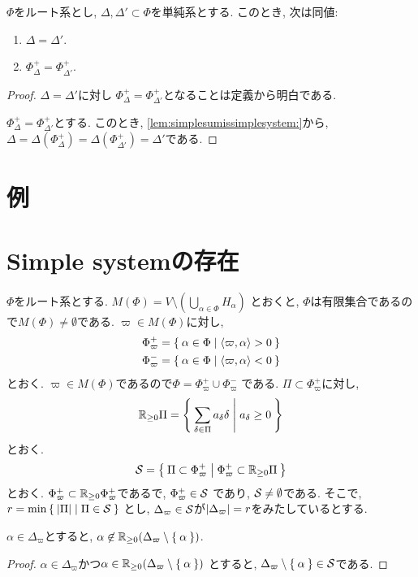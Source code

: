 \begin{theorem}
  $\Phi$をルート系とし,
  $\Delta,\Delta'\subset \Phi$を単純系とする.
  このとき, 次は同値:
  \begin{enumerate}
  \item $\Delta=\Delta'$.
  \item $\Phi_\Delta^+=\Phi_{\Delta'}^+$.
  \end{enumerate}
\end{theorem}
\begin{proof}
  $\Delta=\Delta'$に対し
  $\Phi_\Delta^+=\Phi_{\Delta'}^+$となることは定義から明白である.

  $\Phi_\Delta^+=\Phi_{\Delta'}^+$とする.
  このとき,
  \cref{lem:simplesumissimplesystem:}から,
  $\Delta=\Delta(\Phi_\Delta^+)=\Delta(\Phi_{\Delta'}^+)=\Delta'$である.

\end{proof}

\section{例}

\section{Simple systemの存在}
$\Phi$をルート系とする.
$M(\Phi)=V \setminus (\bigcup_{\alpha\in\Phi}H_\alpha)$
とおくと,
$\Phi$は有限集合であるので$M(\Phi)\neq \emptyset$である.
$\varpi\in M(\Phi)$に対し,
\begin{align*}
  \Phi_{\varpi}^+&=\Set{\alpha\in\Phi|\Braket{\varpi,\alpha}>0}\\
  \Phi_{\varpi}^-&=\Set{\alpha\in\Phi|\Braket{\varpi,\alpha}<0}
\end{align*}
とおく.
$\varpi\in M(\Phi)$であるので$\Phi=\Phi_{\varpi}^+\cup \Phi_{\varpi}^-$
である.
$\Pi\subset \Phi_{\varpi}^+$に対し,
\begin{align*}
  \mathbb{R}_{\geq 0}\Pi =
  \Set{\sum_{\delta\in\Pi}a_\delta \delta|a_\delta \geq 0}
\end{align*}
とおく.
\begin{align*}
  \mathcal{S} =
  \Set{\Pi\subset \Phi_{\varpi}^+|\Phi_{\varpi}^+\subset \mathbb{R}_{\geq 0}\Pi}
\end{align*}
とおく.
$\Phi_{\varpi}^+\subset \mathbb{R}_{\geq 0}\Phi_{\varpi}^+$であるで,
$\Phi_{\varpi}^+\in\mathcal{S}$
であり, $\mathcal{S}\neq\emptyset$である.
そこで, $r=\min\Set{\left|\Pi\right||\Pi\in\mathcal{S}}$
とし, $\Delta_{\varpi}\in\mathcal{S}$が$\left|\Delta_{\varpi}\right|=r$をみたしているとする.
\begin{lemma}
  \label{lem:simple:posiindp}
  $\alpha\in \Delta_{\varpi}$とすると,
  $\alpha\not\in\mathbb{R}_{\geq 0}(\Delta_{\varpi}\setminus\Set{\alpha})$.
\end{lemma}
\begin{proof}
  $\alpha\in \Delta_{\varpi}$かつ$\alpha\in\mathbb{R}_{\geq 0}(\Delta_{\varpi}\setminus\Set{\alpha})$
  とすると, $\Delta_{\varpi}\setminus\Set{\alpha}\in\mathcal{S}$である.
\end{proof}

